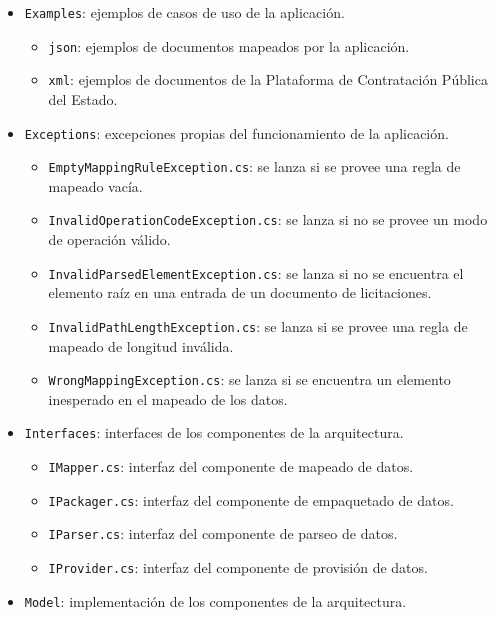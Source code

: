         \begin{itemize}
            \item \texttt{Examples}: ejemplos de casos de uso de la aplicación.
                \begin{itemize}
                    \item \texttt{json}: ejemplos de documentos mapeados por la aplicación.
                    \item \texttt{xml}: ejemplos de documentos de la Plataforma de Contratación Pública del Estado.
                \end{itemize}
            \item \texttt{Exceptions}: excepciones propias del funcionamiento de la aplicación.
                \begin{itemize}
                    \item \texttt{EmptyMappingRuleException.cs}: se lanza si se provee una regla de mapeado vacía.
                    \item \texttt{InvalidOperationCodeException.cs}: se lanza si no se provee un modo de operación válido.
                    \item \texttt{InvalidParsedElementException.cs}: se lanza si no se encuentra el elemento raíz en una entrada de un documento de licitaciones.
                    \item \texttt{InvalidPathLengthException.cs}: se lanza si se provee una regla de mapeado de longitud inválida.
                    \item \texttt{WrongMappingException.cs}: se lanza si se encuentra un elemento inesperado en el mapeado de los datos.
                \end{itemize}
            \item \texttt{Interfaces}: interfaces de los componentes de la arquitectura.
                \begin{itemize}
                    \item \texttt{IMapper.cs}: interfaz del componente de mapeado de datos.
                    \item \texttt{IPackager.cs}: interfaz del componente de empaquetado de datos.
                    \item \texttt{IParser.cs}: interfaz del componente de parseo de datos.
                    \item \texttt{IProvider.cs}: interfaz del componente de provisión de datos.
                \end{itemize}
            \item \texttt{Model}: implementación de los componentes de la arquitectura.

\end{itemize}
